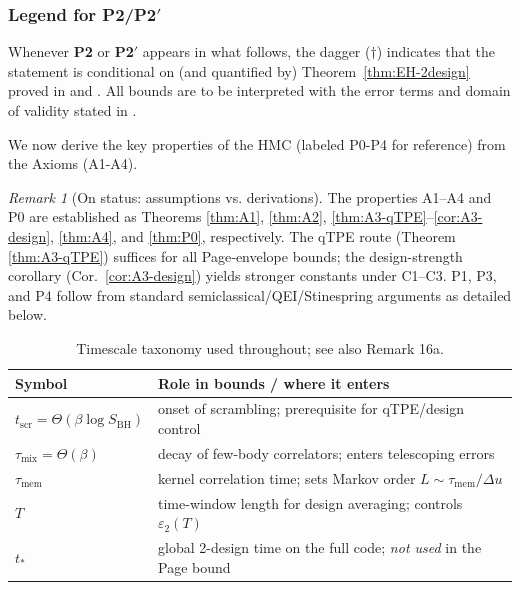 \documentclass[11pt,a4paper]{article}
\newcommand{\Ptwo}{\textbf{P2}\xspace}
\newcommand{\PtwoPrime}{\textbf{P2$'$}\xspace}
\newcommand{\HMC}{\textsc{HMC}\xspace}
\theoremstyle{plain}
\theoremstyle{definition}
\theoremstyle{remark}
\newtheorem{remark}[theorem]{Remark}
\begin{document}
\subsubsection{Legend for \Ptwo/\PtwoPrime}
Whenever \Ptwo or \PtwoPrime appears in what follows, the dagger ($\dagger$) indicates that the statement is conditional on (and quantified by) Theorem~\ref{thm:EH-2design} proved in  and .
All bounds are to be interpreted with the error terms and domain of validity stated in .

\label{sec:derivations_postulates}

\noindent
We now derive the key properties of the \HMC{} (labeled P0-P4 for reference) from the Axioms (A1-A4).


\begin{remark}[On status: assumptions vs. derivations]
\label{rem:status-derivations}
The properties A1–A4 and P0 are established as Theorems \ref{thm:A1}, \ref{thm:A2}, \ref{thm:A3-qTPE}–\ref{cor:A3-design}, \ref{thm:A4}, and \ref{thm:P0}, respectively. The qTPE route (Theorem \ref{thm:A3-qTPE}) suffices for all Page‑envelope bounds; the design-strength corollary (Cor.~\ref{cor:A3-design}) yields stronger constants under C1–C3. P1, P3, and P4 follow from standard semiclassical/QEI/Stinespring arguments as detailed below.
\end{remark}

% 
\begin{table}[t]
\centering
\begin{tabular}{ll}
\textbf{Symbol} & \textbf{Role in bounds / where it enters} \\\hline
$t_{\mathrm{scr}}\!=\!\Theta(\beta\log S_{\mathrm{BH}})$ & onset of scrambling; prerequisite for qTPE/design control \\
$\tau_{\mathrm{mix}}\!=\!\Theta(\beta)$ & decay of few-body correlators; enters telescoping errors \\
$\tau_{\mathrm{mem}}$ & kernel correlation time; sets Markov order $L\!\sim\!\tau_{\mathrm{mem}}/\Delta u$ \\
$T$ & time-window length for design averaging; controls $\varepsilon_2(T)$ \\
$t_\ast$ & global 2-design time on the full code; \emph{not used} in the Page bound \\
\end{tabular}
\caption{Timescale taxonomy used throughout; see also Remark 16a.}
\label{tab:timescales}
\end{table}
\end{document}
